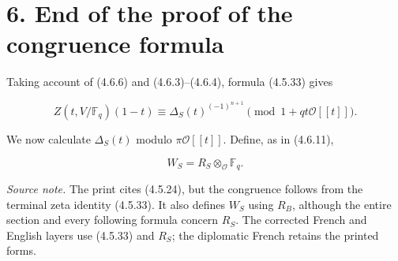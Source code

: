 \section*{6. End of the proof of the congruence formula}

Taking account of (4.6.6) and (4.6.3)--(4.6.4), formula (4.5.33) gives

\begin{equation}\tag{6.0.1}
Z(t,V/\mathbb F_q)(1-t)
\equiv\Delta_S(t)^{(-1)^{n+1}}
\pmod{1+qt\mathcal O[[t]]}.
\end{equation}

We now calculate $\Delta_S(t)$ modulo $\pi\mathcal O[[t]]$.  Define, as in
(4.6.11),

\begin{equation}\tag{6.0.2}
W_S=R_S\otimes_{\mathcal O}\mathbb F_q.
\end{equation}

\medskip
\noindent\emph{Source note.}
The print cites (4.5.24), but the congruence follows from the terminal zeta
identity (4.5.33).  It also defines $W_S$ using $R_B$, although the entire
section and every following formula concern $R_S$.  The corrected French
and English layers use (4.5.33) and $R_S$; the diplomatic French retains
the printed forms.

